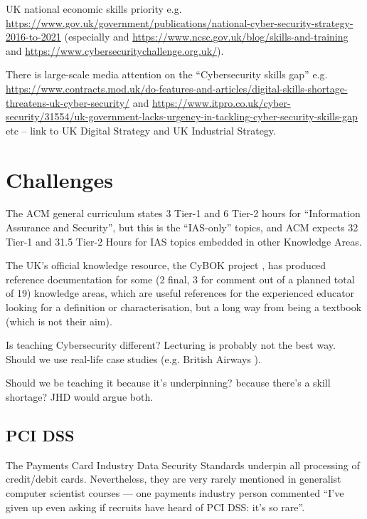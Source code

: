 \documentclass[conference]{IEEEtran}
\begin{document}
UK national economic skills priority
e.g. \url{https://www.gov.uk/government/publications/national-cyber-security-strategy-2016-to-2021}
(especially \cite{JCNSS2018a}
and \url{https://www.ncsc.gov.uk/blog/skills-and-training} and
\url{https://www.cybersecuritychallenge.org.uk/}). 

There is large-scale media
attention on the ``Cybersecurity skills gap''
e.g. \url{https://www.contracts.mod.uk/do-features-and-articles/digital-skills-shortage-threatens-uk-cyber-security/}
and
\url{https://www.itpro.co.uk/cyber-security/31554/uk-government-lacks-urgency-in-tackling-cyber-security-skills-gap}
etc -- link to UK Digital Strategy and UK Industrial Strategy.

\section{Challenges}

The ACM general curriculum \cite{ACM2013a} states 3 Tier-1 and 6 Tier-2 hours for ``Information Assurance and Security'', but this is the ``IAS-only'' topics, and ACM expects 32 Tier-1 and 31.5 Tier-2 Hours for IAS topics embedded in other Knowledge Areas.

The UK's official knowledge resource, the CyBOK project \cite{Bristol2019a}, has produced reference documentation for some (2 final, 3 for comment out of a planned total of 19) knowledge areas, which are useful references for the experienced educator looking for a definition or characterisation, but a long way from being a textbook (which is not their aim).

Is teaching Cybersecurity different? Lecturing is probably not the best way. Should we use real-life case studies (e.g. British Airways \cite{Barth2018a}).  %

  Should we be teaching it because it's underpinning? because there's a skill shortage?  JHD would argue both.


\subsection{PCI DSS}\label{sec:PCIDSS}
The Payments Card Industry Data Security Standards \cite{PCI2018b} underpin all processing of credit/debit cards. Nevertheless, they are very rarely mentioned in generalist computer scientist courses --- one payments industry person commented ``I've given up even asking if recruits have heard of PCI DSS: it's so rare''. 
\end{document}
